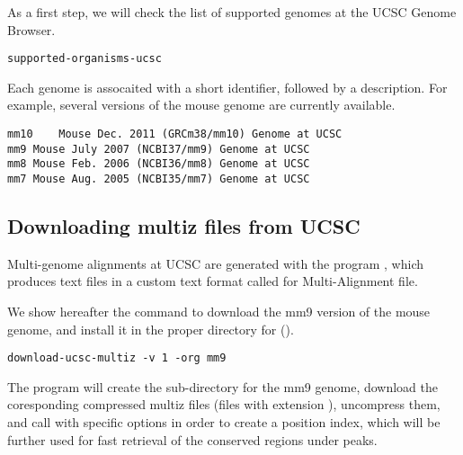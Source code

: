 As a first step, we will check the list of supported genomes at the
UCSC Genome Browser.

\begin{lstlisting}
supported-organisms-ucsc
\end{lstlisting}

Each genome is assocaited with a short identifier, followed by a
description. For example, several versions of the mouse genome are
currently available.


\begin{small}
\begin{verbatim}
mm10	Mouse Dec. 2011 (GRCm38/mm10) Genome at UCSC
mm9	Mouse July 2007 (NCBI37/mm9) Genome at UCSC
mm8	Mouse Feb. 2006 (NCBI36/mm8) Genome at UCSC
mm7	Mouse Aug. 2005 (NCBI35/mm7) Genome at UCSC
\end{verbatim}
\end{small}

\subsection{Downloading multiz files from UCSC}

Multi-genome alignments at UCSC are generated with the program
, which produces text files in a custom text format
called  for Multi-Alignment file.

We show hereafter the command to download the mm9 version of the mouse
genome, and install it in the proper directory for
 ().

\begin{lstlisting}
download-ucsc-multiz -v 1 -org mm9
\end{lstlisting}

The program will create the sub-directory for the mm9 genome, download
the coresponding compressed multiz files (files with extension
), uncompress them, and call 
with specific options in order to create a position index, which will
be further used for fast retrieval of the conserved regions under
peaks.





